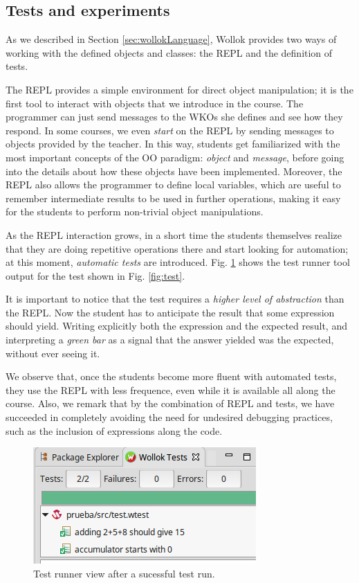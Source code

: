 \subsection{Tests and experiments}
As we described in Section \ref{sec:wollokLanguage}, Wollok provides two ways of working with the defined objects and classes: the REPL and the definition of tests.

The REPL provides a simple environment for direct object manipulation; it is the first tool to interact with objects that we introduce in the course.
The programmer can just send messages to the WKOs she defines and see how they respond. 
In some courses, we even \emph{start} on the REPL by sending messages to objects provided by the teacher.
In this way, students get familiarized with the most important concepts of the OO paradigm: \emph{object} and \emph{message}, before going into the details about how these objects have been implemented.
Moreover, the REPL also allows the programmer to define local variables, which are useful to remember intermediate results to be used in further operations, making it easy for the students to perform non-trivial object manipulations.

\medskip
As the REPL interaction grows, in a short time the students themselves realize that they are doing repetitive operations there and start looking for automation;
at this moment, \emph{automatic tests} are introduced.
Fig. \ref{fig:testRunner.png} shows the test runner tool output for the test shown in Fig. \ref{fig:test}.

It is important to notice that the test requires a \emph{higher level of abstraction} than the REPL.
Now the student has to anticipate the result that some expression should yield. Writing explicitly both the expression and the expected result, and interpreting a \emph{green bar} as a signal that the answer yielded was the expected, without ever seeing it.

We observe that, once the students become more fluent with automated tests, they use the REPL with less frequence, even while it is available all along the course.
Also, we remark that by the combination of REPL and tests, we have succeeded in completely avoiding the need for undesired debugging practices, such as the inclusion of  expressions along the code.

\begin{figure}[ht]
    \centering
	\includegraphics[scale=0.6]{images/testRunner.png}
    \caption{Test runner view after a sucessful test run.}
    \label{fig:testRunner.png}
\vspace{-5mm}
\end{figure}

